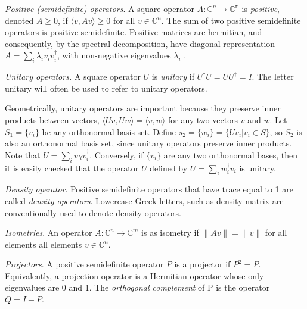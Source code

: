 \begin{definition} \label{def:positive}
  \emph{Positive (semidefinite) operators}. A square operator $A:\mathbb{C}^{n} \rightarrow \mathbb{C^{n}}$ is \emph{positive}, denoted $A \geq 0$, if $\langle v, Av \rangle \geq 0$ for all $v \in \mathbb{C}^{n}$.  The sum of two positive semidefinite operators is positive semidefinite. Positive matrices are hermitian, and consequently, by the spectral decomposition, have diagonal representation $A =  \sum_i \lambda_i v_i v_i^{\dag}$, with non-negative eigenvalues $\lambda_i$ \cite{nielsen2010quantum}.

\end{definition}

\begin{definition}
  \emph{Unitary operators.} A square operator $U$ is \emph{unitary} if $U^{\dagger}U = UU^{\dagger} = I$. The letter \gls{unitary} will often be used to refer to unitary
  operators.
\end{definition}
Geometrically, unitary operators are important because they preserve inner products between vectors, $\langle U v, U w \rangle = \langle v, w \rangle$  for any two vectors $v$ and $w$. Let $S_1=\{v_i\}$ be any orthonormal basis set. Define $ s_2= \{w_i\} = \{U v_i | v_i \in S \}$, so $S_2$ is also an orthonormal basis set, since unitary operators preserve inner products. Note that $U = \sum_{i} w_i v_i^{\dag}$. Conversely, if $\{v_i\}$ are any two orthonormal bases, then it is easily checked that
the operator $U$ defined by $U = \sum_{i} w_i^{\dag} v_i$ is unitary.

\begin{definition}
  \emph{Density operator}. Positive semidefinite operators that have trace equal to 1 are called \emph{density operators}. Lowercase Greek letters, such as \gls{density-matrix} are conventionally used to denote density operators.
\end{definition}

\begin{definition}
  \emph{Isometries}. An operator $A: \mathbb{C}^{n} \rightarrow \mathbb{C}^{m}$ is as isometry if $\|Av\| = \|v\|$ for all elements all elements $v \in \mathbb{C}^{n} $.
\end{definition}

\begin{definition}
  \emph{Projectors}. A positive semidefinite operator $P$ is a projector if $P^2 = P$. Equivalently, a projection operator is a Hermitian operator whose only eigenvalues are 0 and 1. The \emph{orthogonal complement} of P is the operator $Q = I − P$.
\end{definition}

